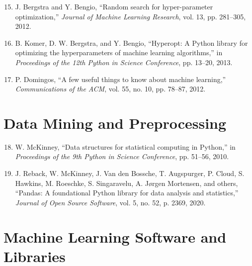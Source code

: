 \begin{enumerate}
  \setcounter{enumi}{14}
  \item J. Bergstra and Y. Bengio, ``Random search for hyper-parameter optimization,'' \textit{Journal of Machine Learning Research}, vol. 13, pp. 281--305, 2012.
  
  \item B. Komer, D. W. Bergstra, and Y. Bengio, ``Hyperopt: A Python library for optimizing the hyperparameters of machine learning algorithms,'' in \textit{Proceedings of the 12th Python in Science Conference}, pp. 13--20, 2013.
  
  \item P. Domingos, ``A few useful things to know about machine learning,'' \textit{Communications of the ACM}, vol. 55, no. 10, pp. 78--87, 2012.
\end{enumerate}

\section*{Data Mining and Preprocessing}

\begin{enumerate}
  \setcounter{enumi}{17}
  \item W. McKinney, ``Data structures for statistical computing in Python,'' in \textit{Proceedings of the 9th Python in Science Conference}, pp. 51--56, 2010.
  
  \item J. Reback, W. McKinney, J. Van den Bossche, T. Augspurger, P. Cloud, S. Hawkins, M. Roeschke, S. Singaravelu, A. Jørgen Mortensen, and others, ``Pandas: A foundational Python library for data analysis and statistics,'' \textit{Journal of Open Source Software}, vol. 5, no. 52, p. 2369, 2020.
\end{enumerate}

\section*{Machine Learning Software and Libraries}

